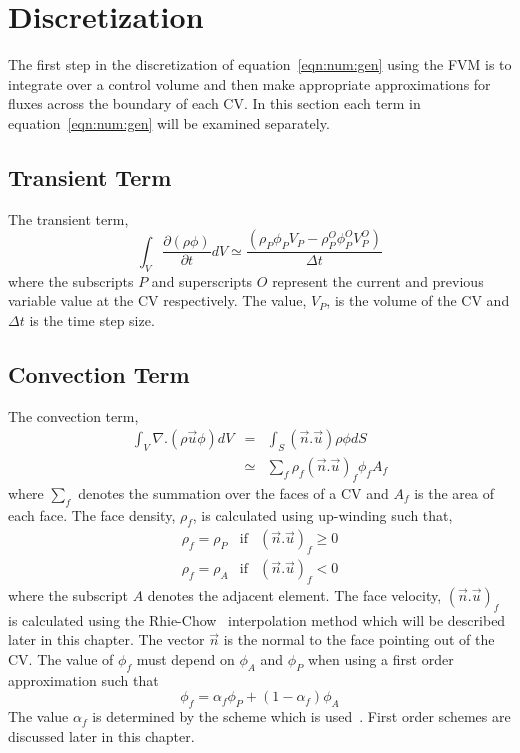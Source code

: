 \section{Discretization}

The first step in the discretization of equation~\eqref{eqn:num:gen}
using the FVM is to integrate over a control volume and then make
appropriate approximations for fluxes across the boundary of each CV.
In this section each term in equation~\eqref{eqn:num:gen} will be
examined separately.

\subsection{Transient Term}

The transient term,
\begin{equation}
\int_V \frac{\partial (\rho \phi)}{\partial t} dV
\simeq
\frac{(\rho_{P} \phi_{P} V_P- \rho_P^O \phi_P^O V_P^O)}{\Delta t}
\label{eqn:num:tra}
\end{equation}
where the subscripts $P$ and superscripts $O$ represent the current
and previous variable value at the CV respectively.
The value, $V_P$, is the volume of
the CV and $\Delta t$ is the time step size.

\subsection{Convection Term}

The convection term,
\begin{eqnarray}
\int_V \nabla.(\rho \vec{u} \phi) dV & = & \int_S (\vec{n}.\vec{u})\rho\phi dS \\
& \simeq & \sum_{f} \rho_f (\vec{n}.\vec{u})_f \phi_f A_f
\label{eqn:num:con}
\end{eqnarray}
where $\sum_{f}$ denotes the summation over the faces of a CV and $A_f$ is
the area of each face.
The face density, $\rho_f$, is calculated using up-winding such that,
\begin{eqnarray}
\rho_f=\rho_P & \mbox{if} & (\vec{n}.\vec{u})_f \ge 0 \\
\rho_f=\rho_A & \mbox{if} & (\vec{n}.\vec{u})_f < 0 
\end{eqnarray}
where the subscript $A$ denotes the adjacent element.
The face velocity, $(\vec{n}.\vec{u})_f$ is calculated using the
Rhie-Chow~\cite{rhie}
interpolation method which will be described later in this chapter. The
vector $\vec{n}$ is the normal to the face pointing out of the CV.
The value of $\phi_f$ must depend on $\phi_A$ and $\phi_P$ when using
a first order approximation such that 
\begin{equation}
\phi_f=\alpha_f \phi_P +(1-\alpha_f)\phi_A
\end{equation}
The value $\alpha_f$ is determined by the scheme which is used~\cite{croftphd}.
First order schemes are discussed later in this chapter.

